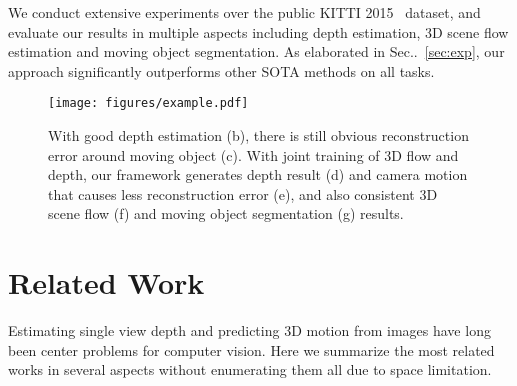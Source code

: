 \documentclass[runningheads]{llncs}
\makeatletter
\newcommand{\secref}[1]{Sec\onedot~\ref{#1}}
\DeclareRobustCommand\onedot{\futurelet\@let@token\@onedot}
\def\onedot{\ifx\@let@token.\else.\null\fi\xspace}
\makeatother
\begin{document}
We conduct extensive experiments over the public KITTI 2015~\cite{geiger2012we} dataset, and evaluate our results in multiple aspects including depth estimation, 3D scene flow estimation and moving object segmentation. As elaborated in \secref{sec:exp}, our approach significantly outperforms other SOTA methods on all tasks.








\begin{figure}
\vspace{-0.8\baselineskip}
\texttt{[image: figures/example.pdf]}
\caption{With good depth estimation (b), there is still obvious reconstruction error around moving object (c). With joint training of 3D flow and depth, our framework generates depth result (d) and camera motion that causes less reconstruction error (e), and also consistent 3D scene flow (f) and moving object segmentation (g) results.}
\label{fig:example}
\vspace{-0.8\baselineskip}
\end{figure}












































%
 
\vspace{-0.5\baselineskip}
\section{Related Work}
\vspace{-0.3\baselineskip}
\label{sec:related}
Estimating single view depth and predicting 3D motion from images have long been center problems for computer vision. Here we summarize the most related works in several aspects without enumerating them all due to space limitation.
\end{document}
